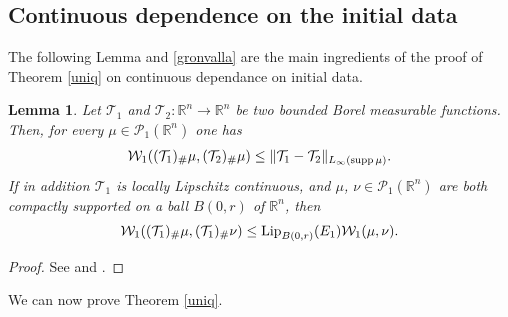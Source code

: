 \documentclass[A4paper,11pt]{article}
\newtheorem{lemma}[theorem]{Lemma}
\theoremstyle{definition}
\newcommand{\Lip}{\textup{Lip}}
\newcommand{\R}{\mathbb{R}}
\newcommand{\W}{\mathcal{W}}
\newcommand{\PP}{\mathcal{P}_1}
\begin{document}
\subsection{Continuous dependence on the initial data}\label{ap4}

The following Lemma and \eqref{gronvalla} are the main ingredients of the proof of Theorem \ref{uniq} on continuous dependance on initial data.

\begin{lemma}\label{primstim}
Let $\mathcal{T}_1$ and $\mathcal{T}_2 \colon \R^n \to \R^n$ be two bounded Borel measurable functions. Then, for every $\mu \in \PP(\R^n)$ one has
\begin{align*}
\W_1((\mathcal{T}_1)_{\#}\mu, (\mathcal{T}_2)_{\#} \mu) \le \|\mathcal{T}_1-\mathcal{T}_2\|_{L_\infty({\rm supp}\,\mu)}.
\end{align*}
If in addition $\mathcal{T}_1$ is locally Lipschitz continuous, and $\mu$, $\nu \in \PP(\R^n)$ are both compactly supported on a ball $B(0,r)$ of $\R^n$, then
\begin{align*}
\W_1((\mathcal{T}_1)_{\#} \mu, (\mathcal{T}_1)_{\#} \nu) \le \Lip_{B(0,r)}(E_1) \W_1(\mu, \nu).
\end{align*}
\end{lemma}

\begin{proof}
See \cite[Lemma 3.11]{CanCarRos10} and \cite[Lemma 3.13]{CanCarRos10}.
\end{proof}

We can now prove Theorem \ref{uniq}.
\end{document}
